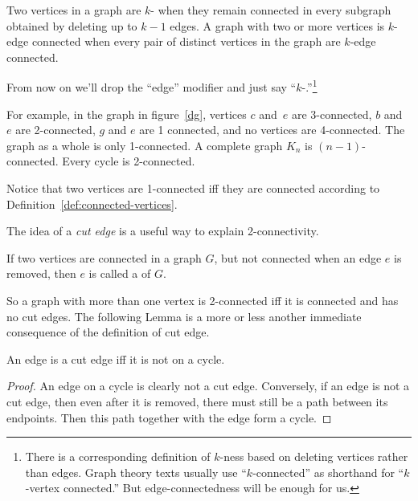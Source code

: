 \begin{definition}\label{def:k-connected}
Two vertices in a graph are $k$- when they remain
connected in every subgraph obtained by deleting up to $k-1$ edges.  A
graph with two or more vertices is $k$-edge
connected when every
pair of distinct vertices in the graph are $k$-edge connected.
\end{definition}
\iffalse
every two of its vertices are $k$-edge connected.
\fi

From now on we'll drop the ``edge'' modifier and just say
``$k$-.''\footnote{There is a corresponding definition
  of $k$-ness based on
  deleting vertices rather than edges.  Graph theory texts usually use
  ``$k$-connected'' as shorthand for ``$k$-vertex connected.''  But
  edge-connectedness will be enough for us.}

For example, in the graph in figure~\ref{dg}, vertices $c$ and~$e$ are
3-connected, $b$ and~$e$ are 2-connected, $g$ and $e$ are 1 connected,
and no vertices are 4-connected.  The graph as a whole is only
1-connected.  A complete graph $K_n$ is $(n-1)$-connected.  Every
cycle is 2-connected.

Notice that two vertices are 1-connected iff they are connected
according to Definition~\ref{def:connected-vertices}.

The idea of a \emph{cut edge} is a useful way to explain 2-connectivity.
\begin{definition}
If two vertices are connected in a graph $G$, but not connected when
an edge $e$ is removed, then $e$ is called a  of $G$.
\end{definition}
So a graph with more than one vertex is 2-connected iff it is
connected and has no cut edges.  The following Lemma is a more or less
another immediate consequence of the definition of cut edge.

\begin{lemma}\label{lem:cutiffcycle}
An edge is a cut edge iff it is not on a cycle.
\end{lemma}

\begin{proof}
An edge on a cycle is clearly not a cut edge.  Conversely, if an edge
is not a cut edge, then even after it is removed, there must still be
a path between its endpoints.  Then this path together with the edge
form a cycle.
\end{proof}

